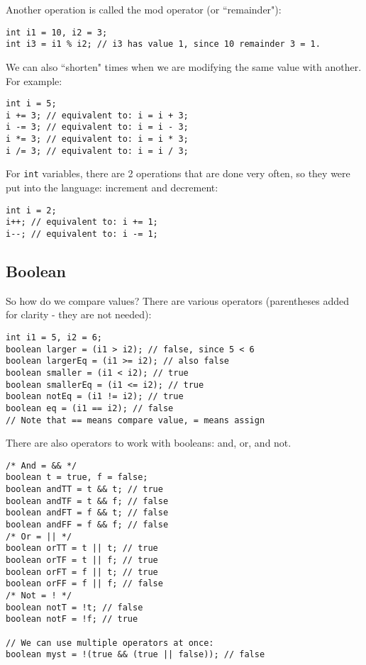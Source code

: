 \noindent Another operation is called the mod operator (or ``remainder"):
\begin{lstlisting}
int i1 = 10, i2 = 3;
int i3 = i1 % i2; // i3 has value 1, since 10 remainder 3 = 1.
\end{lstlisting}

\noindent We can also ``shorten" times when we are modifying the same value with another. For example:
\begin{lstlisting}
int i = 5;
i += 3; // equivalent to: i = i + 3;
i -= 3; // equivalent to: i = i - 3;
i *= 3; // equivalent to: i = i * 3;
i /= 3; // equivalent to: i = i / 3;
\end{lstlisting}

\noindent For \verb|int| variables, there are 2 operations that are done very often, so they were put into the language: increment and decrement:
\begin{lstlisting}
int i = 2;
i++; // equivalent to: i += 1;
i--; // equivalent to: i -= 1;
\end{lstlisting}

\subsection{Boolean}

\noindent So how do we compare values? There are various operators (parentheses added for clarity - they are not needed):
\begin{lstlisting}
int i1 = 5, i2 = 6;
boolean larger = (i1 > i2); // false, since 5 < 6
boolean largerEq = (i1 >= i2); // also false
boolean smaller = (i1 < i2); // true
boolean smallerEq = (i1 <= i2); // true
boolean notEq = (i1 != i2); // true
boolean eq = (i1 == i2); // false
// Note that == means compare value, = means assign
\end{lstlisting}

\noindent There are also operators to work with booleans: and, or, and not.
\begin{lstlisting}
/* And = && */
boolean t = true, f = false;
boolean andTT = t && t; // true
boolean andTF = t && f; // false
boolean andFT = f && t; // false
boolean andFF = f && f; // false
/* Or = || */
boolean orTT = t || t; // true
boolean orTF = t || f; // true
boolean orFT = f || t; // true
boolean orFF = f || f; // false
/* Not = ! */
boolean notT = !t; // false
boolean notF = !f; // true

// We can use multiple operators at once:
boolean myst = !(true && (true || false)); // false
\end{lstlisting}


